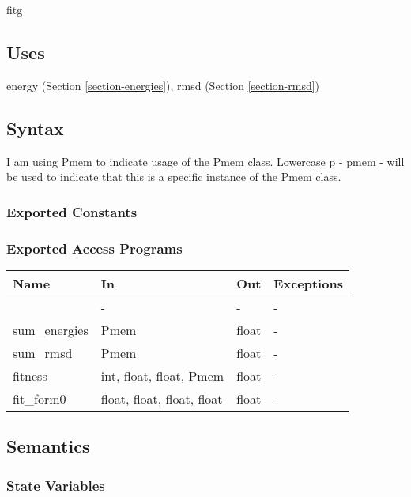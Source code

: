 \documentclass[12pt, titlepage]{article}
\begin{document}
fitg

\subsection{Uses}

energy (Section \ref{section-energies}), rmsd (Section \ref{section-rmsd})

\subsection{Syntax}

I am using Pmem to indicate usage of the Pmem class. Lowercase p - pmem - will 
be used to indicate that this is a specific instance of the Pmem class.

\subsubsection{Exported Constants}

\subsubsection{Exported Access Programs}

\begin{center}
	\begin{tabular}{p{2cm} p{4cm} p{4cm} p{2cm}}
		\hline
		\textbf{Name} & \textbf{In} & \textbf{Out} & \textbf{Exceptions} \\
		\hline
		\wss{accessProg} & - & - & - \\
		sum\_energies & Pmem & float & - \\
		sum\_rmsd & Pmem & float & - \\
		fitness & int, float, float, Pmem & float & - \\
		fit\_form0 & float, float, float, float & float & - \\
		\hline
	\end{tabular}
\end{center}

\subsection{Semantics}

\subsubsection{State Variables}

\end{document}
